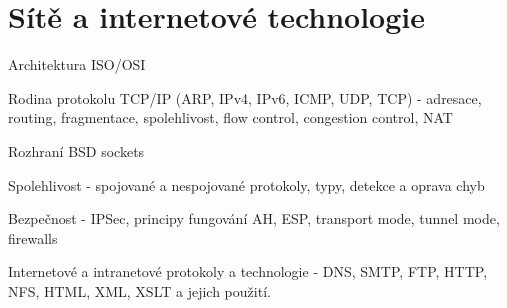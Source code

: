 \section{Sítě a internetové technologie}
\begin{pozadavky}
\begin{pitemize}
\item Architektura ISO/OSI
\item Rodina protokolu TCP/IP (ARP, IPv4, IPv6, ICMP, UDP, TCP) - adresace, routing, fragmentace, spolehlivost, flow control, congestion control, NAT
\item Rozhraní BSD sockets
\item Spolehlivost - spojované a nespojované protokoly, typy, detekce a oprava chyb
\item Bezpečnost - IPSec, principy fungování AH, ESP, transport mode, tunnel mode, firewalls
\item Internetové a intranetové protokoly a technologie - DNS, SMTP, FTP, HTTP, NFS, HTML, XML, XSLT a jejich použití.
\end{pitemize}
\end{pozadavky}








